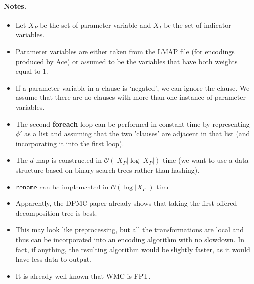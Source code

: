 \documentclass{article}
\theoremstyle{definition}
\theoremstyle{remark}
\begin{document}
\paragraph{Notes.}
\begin{itemize}
\item Let $X_P$ be the set of parameter variable and $X_I$ be the set of
  indicator variables.
\item Parameter variables are either taken from the LMAP file (for encodings
  produced by Ace) or assumed to be the variables that have both weights equal
  to 1.
\item If a parameter variable in a clause is `negated', we can ignore the
  clause. We assume that there are no clauses with more than one instance of
  parameter variables.
\item The second \textbf{foreach} loop can be performed in constant time by
  representing $\phi'$ as a list and assuming that the two 'clauses' are
  adjacent in that list (and incorporating it into the first loop).
\item The $d$ map is constructed in $\mathcal{O}(|X_P|\log|X_P|)$ time (we want
  to use a data structure based on binary search trees rather than hashing).
\item \texttt{rename} can be implemented in $\mathcal{O}(\log |X_P|)$ time.
\item Apparently, the DPMC paper already shows that taking the first offered
  decomposition tree is best.
\item This may look like preprocessing, but all the transformations are local
  and thus can be incorporated into an encoding algorithm with no slowdown. In
  fact, if anything, the resulting algorithm would be slightly faster, as it
  would have less data to output.
\item It is already well-known that WMC is FPT.
\end{itemize}
\end{document}
